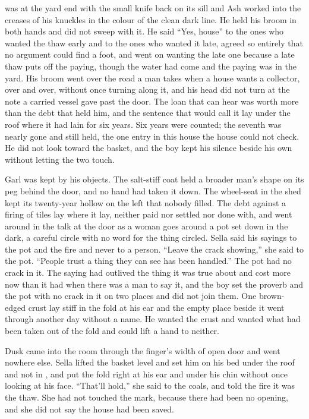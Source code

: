  was at the yard end with the small knife back on its sill and Ash worked into the creases of his knuckles in the colour of the clean dark line. He held his broom in both hands and did not sweep with it. He said “Yes, house” to the ones who wanted the thaw early and to the ones who wanted it late, agreed so entirely that no argument could find a foot, and went on wanting the late one because a late thaw puts off the paying, though the water had come and the paying was in the yard. His broom went over the road a man takes when a house wants a collector, over and over, without once turning along it, and his head did not turn at the note a carried vessel gave past the door. The loan that can hear was worth more than the debt that held him, and the sentence that would call it lay under the roof where it had lain for six years. Six years were counted; the seventh was nearly gone and still held, the one entry in this house the house could not check. He did not look toward the basket, and the boy kept his silence beside his own without letting the two touch.

Garl was kept by his objects. The salt-stiff coat held a broader man's shape on its peg behind the door, and no hand had taken it down. The wheel-seat in the shed kept its twenty-year hollow on the left that nobody filled. The debt against a firing of tiles lay where it lay, neither paid nor settled nor done with, and went around in the talk at the door as a woman goes around a pot set down in the dark, a careful circle with no word for the thing circled. Sella said his sayings to the pot and the fire and never to a person. “Leave the crack showing,” she said to the pot. “People trust a thing they can see has been handled.” The pot had no crack in it. The saying had outlived the thing it was true about and cost more now than it had when there was a man to say it, and the boy set the proverb and the pot with no crack in it on two places and did not join them. One brown-edged crust lay stiff in the fold at his ear and the empty place beside it went through another day without a name. He wanted the crust and wanted what had been taken out of the fold and could lift a hand to neither.

Dusk came into the room through the finger's width of open door and went nowhere else. Sella lifted the basket level and set him on his bed under the roof and not in , and put the fold right at his ear and under his chin without once looking at his face. “That'll hold,” she said to the coals, and told the fire it was the thaw. She had not touched the mark, because there had been no opening, and she did not say the house had been saved.

